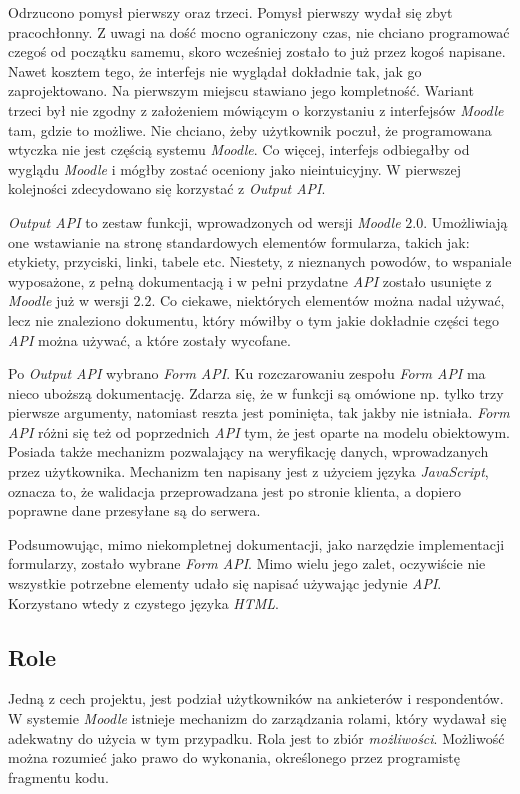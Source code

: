 Odrzucono pomysł pierwszy oraz trzeci. Pomysł pierwszy wydał się zbyt pracochłonny. Z uwagi na dość mocno ograniczony czas, nie chciano programować czegoś od początku samemu, skoro wcześniej zostało to już przez kogoś napisane. Nawet kosztem tego, że interfejs nie wyglądał dokładnie tak, jak go zaprojektowano. Na pierwszym miejscu stawiano jego kompletność. Wariant trzeci był nie zgodny z założeniem mówiącym o korzystaniu z interfejsów \emph{Moodle} tam, gdzie to możliwe. Nie chciano, żeby użytkownik poczuł, że programowana wtyczka nie jest częścią systemu \emph{Moodle}. Co więcej, interfejs odbiegałby od wyglądu \emph{Moodle} i mógłby zostać oceniony jako nieintuicyjny. W pierwszej kolejności zdecydowano się korzystać z \emph{Output API}.

\emph{Output API} to zestaw funkcji, wprowadzonych od wersji \emph{Moodle} $2.0$. Umożliwiają one wstawianie na stronę standardowych elementów formularza, takich jak: etykiety, przyciski, linki, tabele etc. Niestety, z nieznanych powodów, to wspaniale wyposażone, z pełną dokumentacją i w pełni przydatne \emph{API} zostało usunięte z \emph{Moodle} już w wersji $2.2$. Co ciekawe, niektórych elementów można nadal używać, lecz nie znaleziono dokumentu, który mówiłby o tym jakie dokładnie części tego \emph{API} można używać, a które zostały wycofane.

Po \emph{Output API} wybrano \emph{Form API}. Ku rozczarowaniu zespołu \emph{Form API} ma nieco uboższą dokumentację. Zdarza się, że w funkcji są omówione np. tylko trzy pierwsze argumenty, natomiast reszta jest pominięta, tak jakby nie istniała. \emph{Form API} różni się też od poprzednich \emph{API} tym, że jest oparte na modelu obiektowym. Posiada także mechanizm pozwalający na weryfikację danych, wprowadzanych przez użytkownika. Mechanizm ten napisany jest z użyciem języka \emph{JavaScript}, oznacza to, że walidacja przeprowadzana jest po stronie klienta, a dopiero poprawne dane przesyłane są do serwera.

Podsumowując, mimo niekompletnej dokumentacji, jako narzędzie implementacji formularzy, zostało wybrane \emph{Form API}. Mimo wielu jego zalet, oczywiście nie wszystkie potrzebne elementy udało się napisać używając jedynie \emph{API}. Korzystano wtedy z czystego języka \emph{HTML}. 

\subsection{Role}
Jedną z cech projektu, jest podział użytkowników na ankieterów i respondentów. W systemie \emph{Moodle} istnieje mechanizm do zarządzania rolami, który wydawał się adekwatny do użycia w tym przypadku. Rola jest to zbiór \emph{możliwości}. Możliwość można rozumieć jako prawo do wykonania, określonego przez programistę fragmentu kodu.

